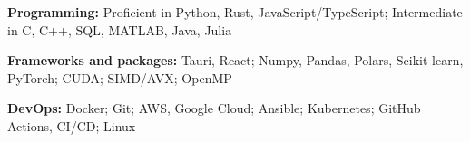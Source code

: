 \begin{enumerate}[label={[\arabic*]},nosep]
  \item \textbf{Programming:} Proficient in Python, Rust, JavaScript/TypeScript; Intermediate in C, C++, SQL, MATLAB, Java, Julia
  \item \textbf{Frameworks and packages:} Tauri, React; Numpy, Pandas, Polars, Scikit-learn, PyTorch; CUDA; SIMD/AVX; OpenMP
  \item \textbf{DevOps:} Docker; Git; AWS, Google Cloud; Ansible; Kubernetes; GitHub Actions, CI/CD; Linux
\end{enumerate}
